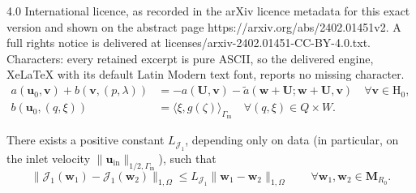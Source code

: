 \documentclass[10pt,a4paper]{amsart}
\newcommand\Gi{\Gamma_{\mathrm{in}}}
\newcommand\Gm{\Gamma_{\mathrm{m}}}
\newcommand\bH{\boldsymbol{\mathrm{H}}}
\newcommand\bM{\mathbf{M}}
\newcommand\bU{\boldsymbol{U}}
\newcommand\bu{\boldsymbol{u}}
\newcommand\bv{\boldsymbol{v}}
\newcommand\bw{\boldsymbol{w}}
\begin{document}
4.0 International licence, as recorded in the arXiv licence metadata for this exact version and shown on the abstract page https://arxiv.org/abs/2402.01451v2. A full rights notice is delivered at licenses/arxiv-2402.01451-CC-BY-4.0.txt. Characters: every retained excerpt is pure ASCII, so the delivered engine, XeLaTeX with its default Latin Modern text font, reports no missing character.
		\begin{align}
			\label{eq:stokes1}   a(\bu_0,\bv)  + b(\bv,(p,\lambda)) & = - a(\bU,\bv) - \widetilde{a}(\bw+\bU;\bw+\bU,\bv) \quad \forall \bv \in \bH_0,\\
			\label{eq:stokes2}    b(\bu_0,(q,\xi)) & = \langle \xi, g(\zeta) \rangle_{\Gm} \quad \forall (q,\xi)\in Q\times W.
		\end{align}

\begin{lemma}\label{lem:ns-lip}
 There exists a positive constant $L_{\mathcal{J}_1}$, depending only on data (in particular, on the inlet velocity $\|\bu_{\mathrm{in}}\|_{1/2,\Gi}$), such that 
 \[\|\mathcal{J}_1(\bw_1)- \mathcal{J}_1(\bw_2)\|_{1,\Omega} \leq L_{\mathcal{J}_1} \|\bw_1 - \bw_2\|_{1,\Omega} \qquad \forall \bw_1,\bw_2 \in \bM_{R_0}.\]
\end{lemma}
\end{document}
